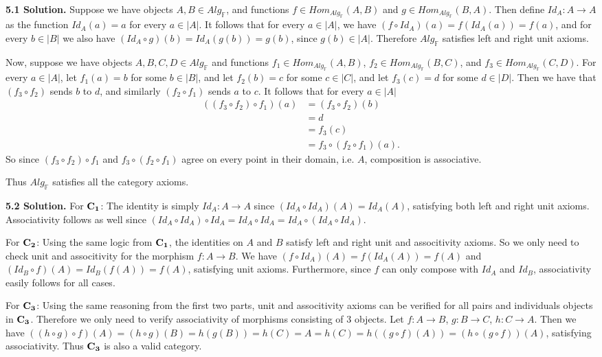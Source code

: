 \textbf{5.1 Solution.} Suppose we have objects $A, B \in Alg_{\mathbb{F}}$, and functions $f \in Hom_{Alg_{\mathbb{F}}}(A, B)$ and $g \in Hom_{Alg_{\mathbb{F}}}(B, A)$. Then define $Id_A : A \to A$ as the function $Id_A(a) = a$ for every $a \in |A|$. It follows that for every $a \in |A|$, we have $(f \circ Id_A)(a) = f(Id_A(a)) = f(a)$, and for every $b \in |B|$ we also have $(Id_A \circ g)(b) = Id_A(g(b)) = g(b)$, since $g(b) \in |A|$. Therefore $Alg_{\mathbb{F}}$ satisfies left and right unit axioms.

Now, suppose we have objects $A, B, C, D \in Alg_{\mathbb{F}}$ and functions $f_1 \in Hom_{Alg_{\mathbb{F}}}(A, B)$, $f_2 \in Hom_{Alg_{\mathbb{F}}}(B, C)$, and $f_3 \in Hom_{Alg_{\mathbb{F}}}(C, D)$. For every $a \in |A|$, let $f_1(a) = b$ for some $b \in |B|$, and let $f_2(b) = c$ for some $c \in |C|$, and let $f_3(c) = d$ for some $d \in |D|$. Then we have that $(f_3 \circ f_2)$ sends $b$ to $d$, and similarly $(f_2 \circ f_1)$ sends $a$ to $c$. It follows that for every $a \in |A|$
\begin{align*}
((f_3 \circ f_2) \circ f_1)(a) &= (f_3 \circ f_2)(b) \\
    &= d \\
    &= f_3(c) \\
    &= f_3 \circ (f_2 \circ f_1)(a).
\end{align*}
So since $(f_3 \circ f_2) \circ f_1$ and $f_3 \circ (f_2 \circ f_1)$ agree on every point in their domain, i.e. $A$, composition is associative.

Thus $Alg_{\mathbb{F}}$ satisfies all the category axioms.

\textbf{5.2 Solution.} For $\bf{C_1}$: The identity is simply $Id_A : A \to A$ since $(Id_A \circ Id_A)(A) = Id_A(A)$, satisfying both left and right unit axioms. Associativity follows as well since $(Id_A \circ Id_A) \circ Id_A = Id_A \circ Id_A = Id_A \circ (Id_A \circ Id_A)$.

For $\bf{C_2}$: Using the same logic from $\bf{C_1}$, the identities on $A$ and $B$ satisfy left and right unit and associtivity axioms. So we only need to check unit and associtivity for the morphism $f: A \to B$. We have $(f \circ Id_A)(A) = f(Id_A(A)) = f(A)$ and $(Id_B \circ f)(A) = Id_B(f(A)) = f(A)$, satisfying unit axioms. Furthermore, since $f$ can only compose with $Id_A$ and $Id_B$, associativity easily follows for all cases.

For $\bf{C_3}$: Using the same reasoning from the first two parts, unit and associtivity axioms can be verified for all pairs and individuals objects in $\bf{C_3}$. Therefore we only need to verify associativity of morphisms consisting of 3 objects. Let $f: A \to B$, $g: B \to C$, $h: C \to A$. Then we have $((h \circ g) \circ f)(A) = (h \circ g)(B) = h(g(B)) = h(C) = A = h(C) = h((g \circ f)(A)) = (h \circ (g \circ f))(A)$, satisfying associativity. Thus $\bf{C_3}$ is also a valid category.

